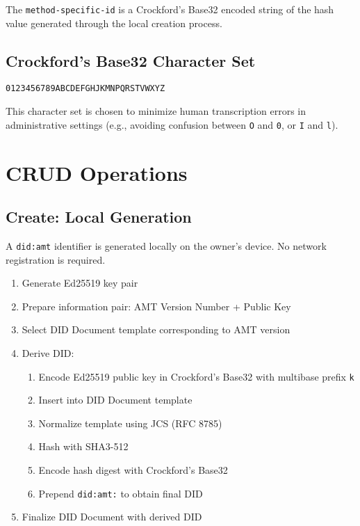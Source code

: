 The \texttt{method-specific-id} is a Crockford's Base32 encoded string of the hash value generated through the local creation process.

\subsection{Crockford's Base32 Character Set}

\texttt{0123456789ABCDEFGHJKMNPQRSTVWXYZ}

This character set is chosen to minimize human transcription errors in administrative settings (e.g., avoiding confusion between \texttt{O} and \texttt{0}, or \texttt{I} and \texttt{l}).

\section{CRUD Operations}

\subsection{Create: Local Generation}

A \texttt{did:amt} identifier is generated locally on the owner's device. No network registration is required.

\begin{enumerate}
  \item Generate Ed25519 key pair
  \item Prepare information pair: AMT Version Number + Public Key
  \item Select DID Document template corresponding to AMT version
  \item Derive DID:
    \begin{enumerate}
      \item Encode Ed25519 public key in Crockford's Base32 with multibase prefix \texttt{k}
      \item Insert into DID Document template
      \item Normalize template using JCS (RFC 8785)
      \item Hash with SHA3-512
      \item Encode hash digest with Crockford's Base32
      \item Prepend \texttt{did:amt:} to obtain final DID
    \end{enumerate}
  \item Finalize DID Document with derived DID
\end{enumerate}

